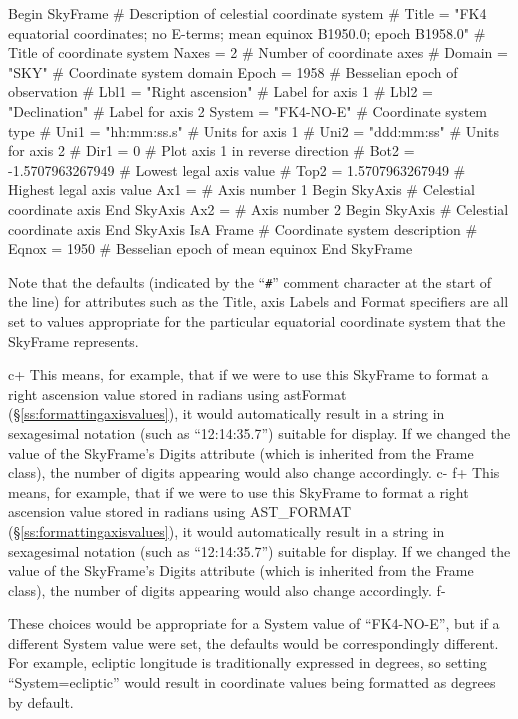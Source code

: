\documentclass[twoside,11pt]{starlink}
\providecommand{\secref}[1]{\S\ref{#1}}
\begin{document}
\begin{terminalv}
 Begin SkyFrame         # Description of celestial coordinate system
#   Title = "FK4 equatorial coordinates; no E-terms; mean equinox B1950.0;
epoch B1958.0"   # Title of coordinate system
    Naxes = 2   # Number of coordinate axes
#   Domain = "SKY"      # Coordinate system domain
    Epoch = 1958        # Besselian epoch of observation
#   Lbl1 = "Right ascension"    # Label for axis 1
#   Lbl2 = "Declination"        # Label for axis 2
    System = "FK4-NO-E"         # Coordinate system type
#   Uni1 = "hh:mm:ss.s"         # Units for axis 1
#   Uni2 = "ddd:mm:ss"  # Units for axis 2
#   Dir1 = 0    # Plot axis 1 in reverse direction
#   Bot2 = -1.5707963267949     # Lowest legal axis value
#   Top2 = 1.5707963267949      # Highest legal axis value
    Ax1 =       # Axis number 1
       Begin SkyAxis    # Celestial coordinate axis
       End SkyAxis
    Ax2 =       # Axis number 2
       Begin SkyAxis    # Celestial coordinate axis
       End SkyAxis
 IsA Frame      # Coordinate system description
#   Eqnox = 1950        # Besselian epoch of mean equinox
 End SkyFrame
\end{terminalv}

Note that the defaults (indicated by the ``\verb?#?'' comment
character at the start of the line) for attributes such as the Title,
axis Labels and Format specifiers are all set to values appropriate
for the particular equatorial coordinate system that the SkyFrame
represents.

c+
This means, for example, that if we were to use this SkyFrame to
format a right ascension value stored in radians using astFormat
(\secref{ss:formattingaxisvalues}), it would automatically result in a
string in sexagesimal notation (such as ``12:14:35.7'') suitable for
display.  If we changed the value of the SkyFrame's Digits attribute
(which is inherited from the Frame class), the number of digits
appearing would also change accordingly.
c-
f+
This means, for example, that if we were to use this SkyFrame to
format a right ascension value stored in radians using AST\_FORMAT
(\secref{ss:formattingaxisvalues}), it would automatically result in a
string in sexagesimal notation (such as ``12:14:35.7'') suitable for
display.  If we changed the value of the SkyFrame's Digits attribute
(which is inherited from the Frame class), the number of digits
appearing would also change accordingly.
f-

These choices would be appropriate for a System value of ``FK4-NO-E'',
but if a different System value were set, the defaults would be
correspondingly different. For example, ecliptic longitude is
traditionally expressed in degrees, so setting ``System=ecliptic''
would result in coordinate values being formatted as degrees by
default.
\end{document}
